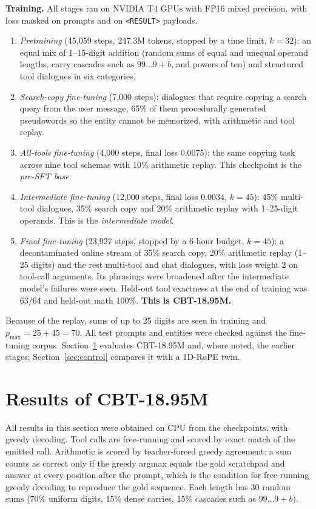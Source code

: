\documentclass[10pt,twocolumn]{article}
\begin{document}
\textbf{Training.} All stages ran on NVIDIA T4 GPUs with FP16 mixed precision, with loss masked on prompts and on \texttt{<RESULT>} payloads.
\begin{enumerate}
\item \emph{Pretraining} (45,059 steps, 247.3M tokens, stopped by a time limit, $k=32$): an equal mix of 1--15-digit addition (random sums of equal and unequal operand lengths, carry cascades such as $99\ldots9+b$, and powers of ten) and structured tool dialogues in six categories.
\item \emph{Search-copy fine-tuning} (7,000 steps): dialogues that require copying a search query from the user message, 65\% of them procedurally generated pseudowords so the entity cannot be memorized, with arithmetic and tool replay.
\item \emph{All-tools fine-tuning} (4,000 steps, final loss 0.0075): the same copying task across nine tool schemas with 10\% arithmetic replay. This checkpoint is the \emph{pre-SFT base}.
\item \emph{Intermediate fine-tuning} (12,000 steps, final loss 0.0034, $k=45$): 45\% multi-tool dialogues, 35\% search copy and 20\% arithmetic replay with 1--25-digit operands. This is the \emph{intermediate model}.
\item \emph{Final fine-tuning} (23,927 steps, stopped by a 6-hour budget, $k=45$): a decontaminated online stream of 35\% search copy, 20\% arithmetic replay (1--25 digits) and the rest multi-tool and chat dialogues, with loss weight 2 on tool-call arguments. Its phrasings were broadened after the intermediate model's failures were seen. Held-out tool exactness at the end of training was 63/64 and held-out math 100\%. \textbf{This is CBT-18.95M.}
\end{enumerate}
Because of the replay, sums of up to 25 digits are seen in training and $p_{\max} = 25 + 45 = 70$. All test prompts and entities were checked against the fine-tuning corpus. Section~\ref{sec:results} evaluates CBT-18.95M and, where noted, the earlier stages; Section~\ref{sec:control} compares it with a 1D-RoPE twin.

\section{Results of CBT-18.95M}\label{sec:results}

All results in this section were obtained on CPU from the checkpoints, with greedy decoding. Tool calls are free-running and scored by exact match of the emitted call. Arithmetic is scored by teacher-forced greedy agreement: a sum counts as correct only if the greedy argmax equals the gold scratchpad and answer at every position after the prompt, which is the condition for free-running greedy decoding to reproduce the gold sequence. Each length has 30 random sums (70\% uniform digits, 15\% dense carries, 15\% cascades such as $99\ldots9+b$).
\end{document}
